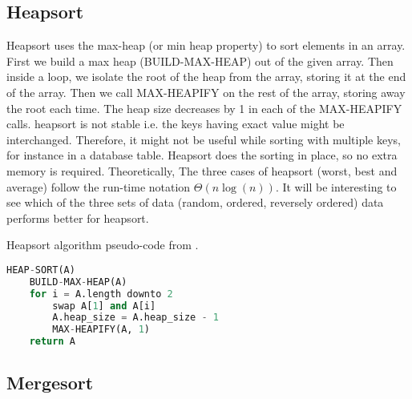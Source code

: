 \documentclass[sigconf, nonacm, natbib, screen, balance=False]{acmart}
\begin{document}
\subsection{Heapsort}\label{sec:heapsort}
Heapsort uses the max-heap (or min heap property) to sort elements in an array. First we build a max heap (BUILD-MAX-HEAP) out of the given array. Then inside a loop, we isolate the root of the heap from the array, storing it at the end of the array. Then we call MAX-HEAPIFY on the rest of the array, storing away the root each time. The heap size decreases by 1 in each of the MAX-HEAPIFY calls. heapsort is not stable i.e. the keys having exact value might be interchanged. Therefore, it might not be useful while sorting with multiple keys, for instance in a database table.\newline
Heapsort does the sorting in place, so no extra memory is required. Theoretically, The three cases of heapsort (worst, best and average) follow the run-time notation $\Theta \left(n\log\left(n\right)\right)$. It will be interesting to see which of the three sets of data (random, ordered, reversely ordered) data performs better for heapsort. 

\begin{listing}
\caption{Heapsort algorithm pseudo-code from \citet[Ch.~6.4]{CLRS_2009}.}
\label{lst:heap_algo}
\begin{lstlisting}[language=Python]
HEAP-SORT(A)
    BUILD-MAX-HEAP(A)
    for i = A.length downto 2
        swap A[1] and A[i]
        A.heap_size = A.heap_size - 1
        MAX-HEAPIFY(A, 1)
    return A
\end{lstlisting}
\end{listing}

\subsection{Mergesort}\label{sec:mergesort}
\end{document}
